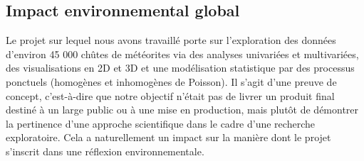 \documentclass[12pt]{article}
\begin{document}
\subsection{Impact environnemental global}
Le projet sur lequel nous avons travaillé porte sur l’exploration des données d'environ 45 000 chûtes de météorites via des analyses univariées et multivariées, des visualisations en 2D et 3D et une modélisation statistique par des processus ponctuels (homogènes et inhomogènes de Poisson). Il s’agit d’une preuve de concept, c’est-à-dire que notre objectif n’était pas de livrer un produit final destiné à un large public ou à une mise en production, mais plutôt de démontrer la pertinence d’une approche scientifique dans le cadre d’une recherche exploratoire. Cela a naturellement un impact sur la manière dont le projet s’inscrit dans une réflexion environnementale.
\end{document}
